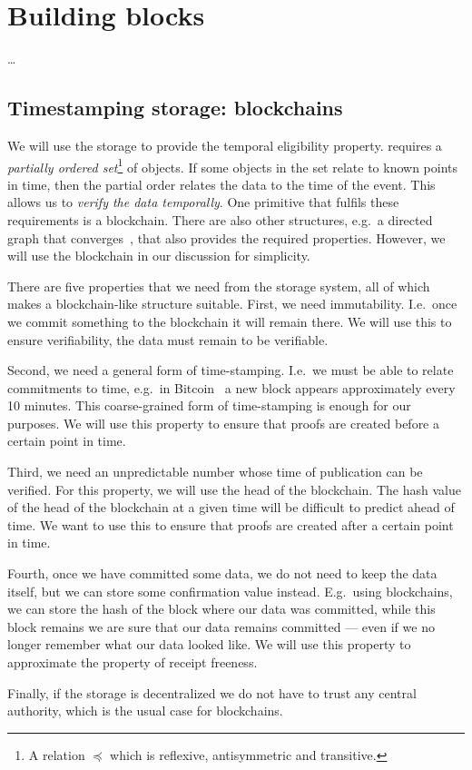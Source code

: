 \mode*
\section{Building blocks}%
\label{Primitives}\label{BuildingBlocks}

\dots



%



\subsection{Timestamping storage: blockchains}%
\label{StorageProperties}

We will use the storage to provide the temporal eligibility property.
 requires a \emph{partially ordered 
  set}\footnote{%
  A relation \(\preceq\) which is reflexive, antisymmetric and transitive.
} of objects.
If some objects in the set relate to known points in time, then the partial 
order relates the data to the time of the event.
This allows us to \emph{verify the data temporally}.
One primitive that fulfils these requirements is a blockchain.
There are also other structures, e.g.\ a directed graph that 
converges~\cite{BlockchainFreeCryptocurrencies}, that also provides the required 
properties.
However, we will use the blockchain in our discussion for simplicity.

There are five properties that we need from the storage system, all of which 
makes a blockchain-like structure suitable.
First, we need immutability.
I.e.\ once we commit something to the blockchain it will remain there.
We will use this to ensure verifiability, the data must remain to be verifiable.

Second, we need a general form of time-stamping.
I.e.\ we must be able to relate commitments to time, e.g.\ in 
Bitcoin~\cite{Bitcoin} a new block appears approximately every 10 minutes.
This coarse-grained form of time-stamping is enough for our purposes.
We will use this property to ensure that proofs are created before a certain 
point in time.

Third, we need an unpredictable number whose time of publication can be 
verified.
For this property, we will use the head of the blockchain.
The hash value of the head of the blockchain at a given time will be difficult 
to predict ahead of time.
We want to use this to ensure that proofs are created after a certain point in 
time.

Fourth, once we have committed some data, we do not need to keep the data 
itself, but we can store some confirmation value instead.
E.g.\ using blockchains, we can store the hash of the block where our data was 
committed, while this block remains we are sure that our data remains committed 
--- even if we no longer remember what our data looked like.
We will use this property to approximate the property of receipt freeness.

Finally, if the storage is decentralized we do not have to trust any central 
authority, which is the usual case for blockchains.
